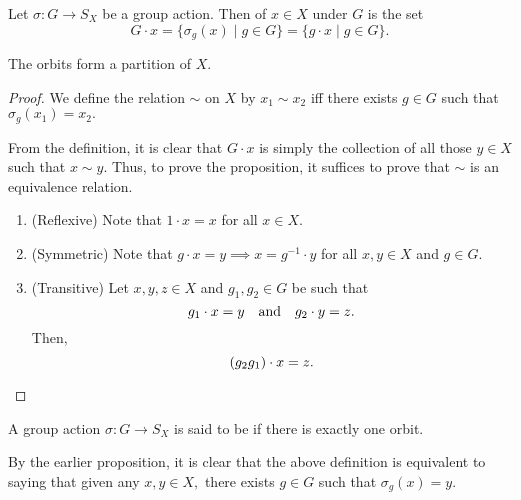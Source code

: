 
\begin{defn}%
	Let $\sigma : G \to S_X$ be a group action. Then  of $x \in X$ under $G$ is the set
	\begin{equation*} 
		G \cdot x = \{\sigma_g(x) \mid g \in G\} = \{g \cdot x \mid g \in G\}.
	\end{equation*}
\end{defn}

\begin{prop} \label{prop:orbitspartitionX}
	The orbits form a partition of $X.$
\end{prop}
\begin{proof} 
	We define the relation $\sim$ on $X$ by $x_1 \sim x_2$ iff there exists $g \in G$ such that $\sigma_g(x_1) = x_2.$

	From the definition, it is clear that $G \cdot x$ is simply the collection of all those $y \in X$ such that $x \sim y.$ Thus, to prove the proposition, it suffices to prove that $\sim$ is an equivalence relation. 

	\begin{enumerate}
		\item (Reflexive) Note that $1 \cdot x = x$ for all $x \in X.$
		\item (Symmetric) Note that $g \cdot x = y \implies x = g^{-1} \cdot y$ for all $x, y \in X$ and $g \in G.$
		\item (Transitive) Let $x, y, z \in X$ and $g_1, g_2 \in G$ be such that
		\begin{equation*} 
			g_1 \cdot x = y \quad\text{and}\quad g_2 \cdot y = z.
		\end{equation*}
		Then,
		\begin{equation*} 
			(g_2g_1) \cdot x = z. \qedhere
		\end{equation*}
	\end{enumerate}
\end{proof}

\begin{defn}%
	A group action $\sigma : G \to S_X$ is said to be  if there is exactly one orbit.
\end{defn}

\begin{rem}
	By the earlier proposition, it is clear that the above definition is equivalent to saying that given any $x, y \in X,$ there exists $g \in G$ such that $\sigma_g(x) = y.$
\end{rem}

